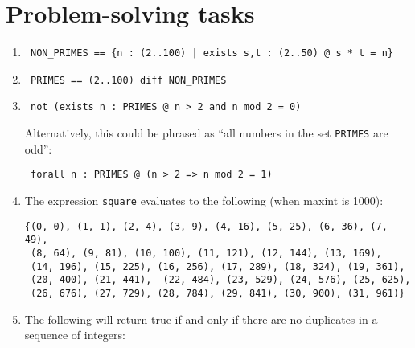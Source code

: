 \documentclass{article}
\begin{document}
%

\lstset{language=}
\section*{Problem-solving tasks}

\begin{enumerate}

 \item 
\begin{lstlisting}
 NON_PRIMES == {n : (2..100) | exists s,t : (2..50) @ s * t = n}
\end{lstlisting}

 \item 
\begin{lstlisting}
 PRIMES == (2..100) diff NON_PRIMES
\end{lstlisting}
 
 \item 

\begin{lstlisting}
 not (exists n : PRIMES @ n > 2 and n mod 2 = 0)
\end{lstlisting}

Alternatively, this could be phrased as ``all numbers in the set \texttt{PRIMES} are odd'':

\vspace{2mm}

\begin{lstlisting}
 forall n : PRIMES @ (n > 2 => n mod 2 = 1)
\end{lstlisting}

\item The expression \texttt{square} evaluates to the following (when maxint is 1000):

\vspace{2mm}

\begin{lstlisting}
{(0, 0), (1, 1), (2, 4), (3, 9), (4, 16), (5, 25), (6, 36), (7, 49),
 (8, 64), (9, 81), (10, 100), (11, 121), (12, 144), (13, 169), 
 (14, 196), (15, 225), (16, 256), (17, 289), (18, 324), (19, 361), 
 (20, 400), (21, 441),  (22, 484), (23, 529), (24, 576), (25, 625), 
 (26, 676), (27, 729), (28, 784), (29, 841), (30, 900), (31, 961)}
\end{lstlisting}

\item The following will return true if and only if there are no duplicates in a sequence of integers:


\end{enumerate}
\end{document}
